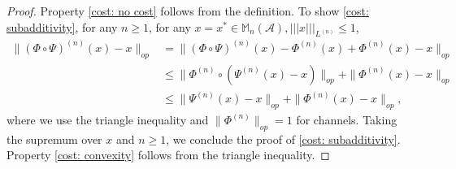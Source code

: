 \documentclass[11pt,reqno]{amsart}
\numberwithin{equation}{section}
\newcommand{\mb}{\mathbb}
\newcommand{\mc}{\mathcal}
\newcommand{\Cost}{\mathrm{Cost}}
\newcommand{\CScb}{\Cost_{\mc S}^{cb}}
\begin{document}
\begin{proof}

Property \eqref{cost: no cost} follows from the definition. To show \eqref{cost: subadditivity}, for any $n\ge 1$, for any $x=x^*\in \mb M_n(\mc A), |||x|||_{L^{(n)}} \le 1$,
\begin{align*}
    \|(\Phi \circ \Psi)^{(n)}(x) - x\|_{op} & = \|(\Phi \circ \Psi)^{(n)}(x) - \Phi^{(n)}(x) + \Phi^{(n)}(x)- x\|_{op} \\
    & \le \|\Phi^{(n)}\circ (\Psi^{(n)}(x) - x)\|_{op} + \|\Phi^{(n)}(x)- x\|_{op} \\
    & \le \|\Psi^{(n)}(x) - x\|_{op} + \|\Phi^{(n)}(x)- x\|_{op},
\end{align*}
where we use the triangle inequality and $\|\Phi^{(n)}\|_{op} = 1$ for channels. Taking the supremum over $x$ and $n\ge 1$, we conclude the proof of \eqref{cost: subadditivity}. Property \eqref{cost: convexity} follows from the triangle inequality. 
\end{proof}
\end{document}
